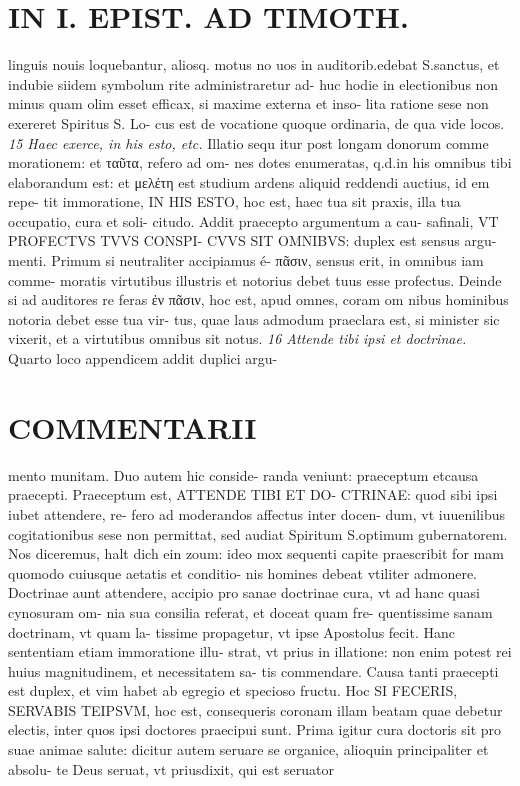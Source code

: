 \documentclass{article}
\begin{document}
\begin{pages}
\section*{IN I. EPIST. AD TIMOTH. }
\marginpar{[ p.113 ]}\pstart linguis nouis loquebantur, aliosq. motus no uos in auditorib.edebat S.sanctus, et indubie siidem symbolum rite administraretur ad- huc hodie in electionibus non minus quam olim esset efficax, si maxime externa et inso- lita ratione sese non exereret Spiritus S. Lo- cus est de vocatione quoque ordinaria, de qua vide locos.  \pend
\textit{15 Haec exerce, in his esto, etc. }\pstart Illatio sequ itur post longam donorum comme morationem: et ταῦτα, refero ad om- nes dotes enumeratas, q.d.in his omnibus tibi elaborandum est: et μελέτη est studium ardens aliquid reddendi auctius, id em repe- tit immoratione, IN HIS ESTO, hoc est, haec tua sit praxis, illa tua occupatio, cura et soli- citudo. Addit praecepto argumentum a cau- safinali, VT PROFECTVS TVVS CONSPI- CVVS SIT OMNIBVS: duplex est sensus argu- menti. Primum si neutraliter accipiamus é- πᾶσιν, sensus erit, in omnibus iam comme- moratis virtutibus illustris et notorius debet tuus esse profectus. Deinde si ad auditores re feras ἐν πᾶσιν, hoc est, apud omnes, coram om nibus hominibus notoria debet esse tua vir- tus, quae laus admodum praeclara est, si minister sic vixerit, et a virtutibus omnibus sit notus.  \pend
\textit{16 Attende tibi ipsi et doctrinae. }\pstart Quarto loco appendicem addit duplici argu-  \pend
\section*{COMMENTARII }
\marginpar{[ p.114 ]}\pstart mento munitam. Duo autem hic conside- randa veniunt: praeceptum etcausa praecepti. Praeceptum est, ATTENDE TIBI ET DO- CTRINAE: quod sibi ipsi iubet attendere, re- fero ad moderandos affectus inter docen- dum, vt iuuenilibus cogitationibus sese non permittat, sed audiat Spiritum S.optimum gubernatorem. Nos diceremus, halt dich ein zoum: ideo mox sequenti capite praescribit for mam quomodo cuiusque aetatis et conditio- nis homines debeat vtiliter admonere.  \pend\pstart Doctrinae aunt attendere, accipio pro sanae doctrinae cura, vt ad hanc quasi cynosuram om- nia sua consilia referat, et doceat quam fre- quentissime sanam doctrinam, vt quam la- tissime propagetur, vt ipse Apostolus fecit. Hanc sententiam etiam immoratione illu- strat, vt prius in illatione: non enim potest rei huius magnitudinem, et necessitatem sa- tis commendare.  \pend\pstart Causa tanti praecepti est duplex, et vim habet ab egregio et specioso fructu. Hoc SI FECERIS, SERVABIS TEIPSVM, hoc est, consequeris coronam illam beatam quae debetur electis, inter quos ipsi doctores praecipui sunt. Prima igitur cura doctoris sit pro suae animae salute: dicitur autem seruare se organice, alioquin principaliter et absolu- te Deus seruat, vt priusdixit, qui est seruator  \pend

\end{pages}
\end{document}
